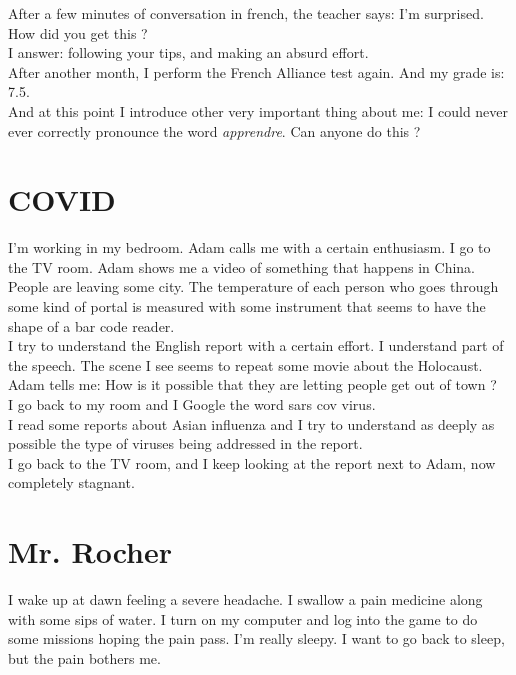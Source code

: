 \documentclass[11pt]{book}
\begin{document}
\noindent After a few minutes of conversation in french, the teacher says: I'm surprised. How did you get this ? \\

\noindent I answer: following your tips, and making an absurd effort. \\

\noindent After another month, I perform the French Alliance test again. And my grade is: 7.5. \\

\noindent And at this point I introduce other very important thing about me: I could never ever correctly pronounce the word \emph{apprendre}. Can anyone do this ?

\chapter{COVID}

\noindent I'm working in my bedroom. Adam calls me with a certain enthusiasm. I go to the TV room. Adam shows me a video of something that happens in China. People are leaving some city. The temperature of each person who goes through some kind of portal is measured with some instrument that seems to have the shape of a bar code reader. \\

\noindent I try to understand the English report with a certain effort. I understand part of the speech. The scene I see seems to repeat some movie about the Holocaust. \\

\noindent Adam tells me: How is it possible that they are letting people get out of town ? \\

\noindent I go back to my room and I Google the word sars cov virus. \\

\noindent I read some reports about Asian influenza and I try to understand as deeply as possible the type of viruses being addressed in the report. \\

\noindent I go back to the TV room, and I keep looking at the report next to Adam, now completely stagnant.

\chapter{Mr. Rocher}

\noindent I wake up at dawn feeling a severe headache. I swallow a pain medicine along with some sips of water. I turn on my computer and log into the game to do some missions hoping the pain pass. I'm really sleepy. I want to go back to sleep, but the pain bothers me. \\
\end{document}
